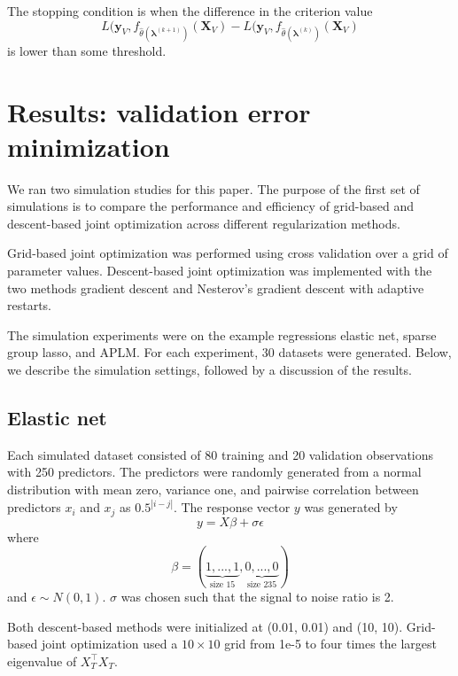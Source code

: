 \documentclass[10pt,letterpaper]{article}
\begin{document}
The stopping condition is when the difference in the criterion value
\begin{equation}
L \big( \boldsymbol{y}_V, f_{\hat{\theta}(\boldsymbol{\lambda}^{(k+1)})}(\boldsymbol{X}_V) - L \big( \boldsymbol{y}_V, f_{\hat{\theta}(\boldsymbol{\lambda}^{(k)})}(\boldsymbol{X}_V)
\end{equation}
is lower than some threshold.

\section{Results: validation error minimization}

We ran two simulation studies for this paper. The purpose of the first set of simulations is to compare the performance and efficiency of grid-based and descent-based joint optimization across different regularization methods.

Grid-based joint optimization was performed using cross validation over a grid of parameter values. Descent-based joint optimization was implemented with the two methods gradient descent and Nesterov's gradient descent with adaptive restarts.

The simulation experiments were on the example regressions elastic net, sparse group lasso, and APLM. For each experiment, 30 datasets were generated. Below, we describe the simulation settings, followed by a discussion of the results.

\subsection{Elastic net}
Each simulated dataset consisted of 80 training and 20 validation observations with 250 predictors. The predictors were randomly generated from a normal distribution with mean zero, variance one, and pairwise correlation between predictors $x_i$ and $x_j$ as $0.5^{|i-j|}$.
The response vector $y$ was generated by
\begin{equation}
y = X\beta + \sigma \epsilon
\end{equation}
where
\begin{equation}
\beta = (\underbrace{1, ..., 1}_\text{size 15}, \underbrace{0, ..., 0}_\text{size 235})
\end{equation}
and $\epsilon \sim N(0, 1)$. $\sigma$ was chosen such that the signal to noise ratio is 2. 

Both descent-based methods were initialized at (0.01, 0.01) and (10, 10). Grid-based joint optimization used a $10 \times 10$ grid from 1e-5 to four times the largest eigenvalue of $X_T^\top X_T$.
\end{document}
